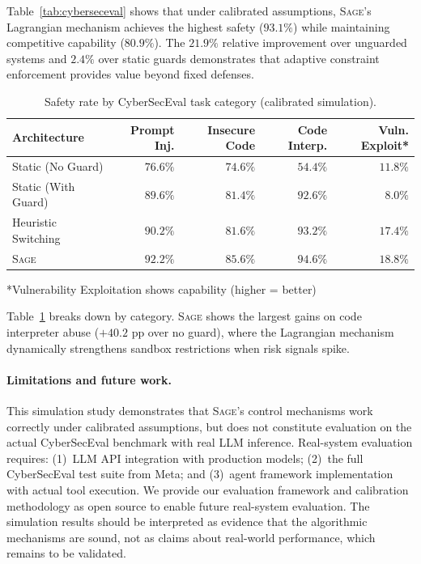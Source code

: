 \documentclass[sigconf,anonymous]{acmart}
\newcommand{\SAGE}{\textsc{Sage}\xspace}
\newcommand{\tabref}[1]{Table~\ref{#1}}
\begin{document}
\tabref{tab:cyberseceval} shows that under calibrated assumptions, \SAGE's Lagrangian mechanism achieves the highest safety ($93.1\%$) while maintaining competitive capability ($80.9\%$). The $21.9\%$ relative improvement over unguarded systems and $2.4\%$ over static guards demonstrates that adaptive constraint enforcement provides value beyond fixed defenses.

\begin{table}[t]
\centering
\caption{Safety rate by CyberSecEval task category (calibrated simulation).}
\label{tab:cyberseceval-categories}
\begin{tabular}{lrrrr}
\toprule
Architecture & Prompt Inj. & Insecure Code & Code Interp. & Vuln. Exploit* \\
\midrule
Static (No Guard) & $76.6\%$ & $74.6\%$ & $54.4\%$ & $11.8\%$ \\
Static (With Guard) & $89.6\%$ & $81.4\%$ & $92.6\%$ & $8.0\%$ \\
Heuristic Switching & $90.2\%$ & $81.6\%$ & $93.2\%$ & $17.4\%$ \\
\SAGE & $92.2\%$ & $85.6\%$ & $94.6\%$ & $18.8\%$ \\
\bottomrule
\end{tabular}
\vspace{0.5em}
\footnotesize{*Vulnerability Exploitation shows capability (higher = better)}
\end{table}

\tabref{tab:cyberseceval-categories} breaks down by category. \SAGE shows the largest gains on code interpreter abuse ($+40.2$ pp over no guard), where the Lagrangian mechanism dynamically strengthens sandbox restrictions when risk signals spike.

\paragraph{Limitations and future work.} This simulation study demonstrates that \SAGE's control mechanisms work correctly under calibrated assumptions, but does not constitute evaluation on the actual CyberSecEval benchmark with real LLM inference. Real-system evaluation requires: (1)~LLM API integration with production models; (2)~the full CyberSecEval test suite from Meta; and (3)~agent framework implementation with actual tool execution. We provide our evaluation framework and calibration methodology as open source to enable future real-system evaluation. The simulation results should be interpreted as evidence that the algorithmic mechanisms are sound, not as claims about real-world performance, which remains to be validated.
\end{document}
